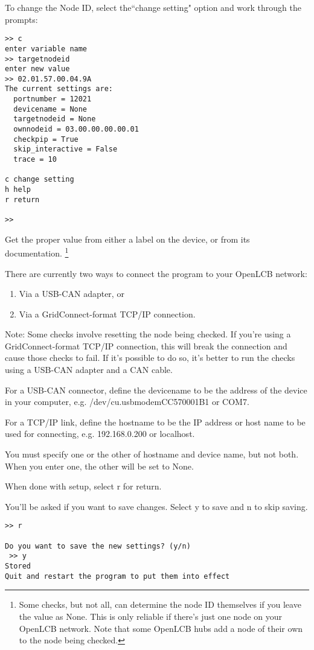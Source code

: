To change the Node ID, select the``change setting" option and work through the prompts:

\begin{verbatim}
>> c
enter variable name
>> targetnodeid
enter new value
>> 02.01.57.00.04.9A
The current settings are:
  portnumber = 12021
  devicename = None
  targetnodeid = None
  ownnodeid = 03.00.00.00.00.01
  checkpip = True
  skip_interactive = False
  trace = 10

c change setting
h help
r return

>>
\end{verbatim}

Get the proper value from either a label on the device, or from its documentation.
\footnote{Some checks, but not all, can determine the node ID themselves if you leave
    the value as None. This is only reliable if there's just one node on your OpenLCB
    network.  Note that some OpenLCB hubs add a node of their own to the node
    being checked.}

There are currently two ways to connect the program to your OpenLCB network:
\begin{enumerate}
\item Via a USB-CAN adapter, or
\item Via a GridConnect-format TCP/IP connection.
\end{enumerate}

Note:  Some checks involve resetting the node being checked.
If you're using a GridConnect-format TCP/IP connection, this will break the
connection and cause those checks to fail.  If it's possible to do so, it's
better to run the checks using a USB-CAN adapter and a CAN cable.

For a USB-CAN connector, define the devicename to be the address of the device in your computer,
e.g. /dev/cu.usbmodemCC570001B1 or COM7.

For a TCP/IP link, define the hostname to be the IP address or host name to be used
for connecting, e.g. 192.168.0.200 or localhost.

You must specify one or the other of hostname and device name, but not both.
When you enter one, the other will be set to None.

When done with setup, select r for return.

You'll be asked if you want to save changes.
Select y to save and n to skip saving.

\begin{verbatim}
>> r

Do you want to save the new settings? (y/n)
 >> y
Stored
Quit and restart the program to put them into effect
\end{verbatim}


